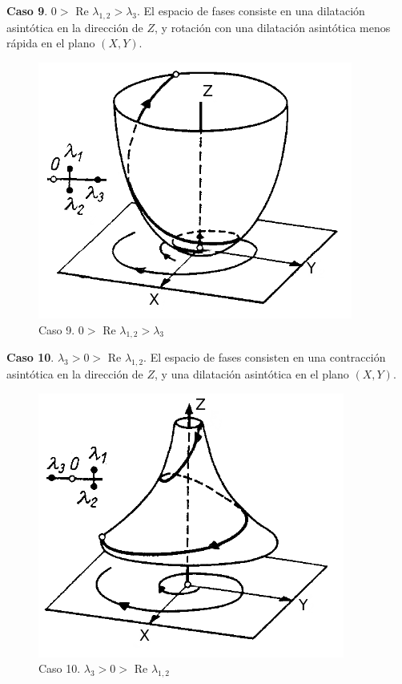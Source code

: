 \documentclass[a4paper,10pt]{article}
\begin{document}
\textbf{Caso 9}. $0 > $ Re $\lambda_{1,2} > \lambda_3$. El espacio de fases consiste en una dilatación asintótica
en la dirección de $Z$, y rotación con una dilatación asintótica menos rápida en el plano $(X,Y)$.

\begin{figure}[h!]
 \centering
\includegraphics[scale=0.35]{problema3fig10}
\caption{Caso 9. $0 > $ Re $\lambda_{1,2} > \lambda_3$}
\label{fig:problema3fig10}
\end{figure}
\vspace{.3cm}

\textbf{Caso 10}. $\lambda_3 > 0 > $ Re $\lambda_{1,2}$. El espacio de fases consisten en una contracción asintótica
en la dirección de $Z$, y una dilatación asintótica en el plano $(X,Y)$.

\begin{figure}[h!]
 \centering
\includegraphics[scale=0.35]{problema3fig11}
\caption{Caso 10. $\lambda_3 > 0 > $ Re $\lambda_{1,2}$}
\label{fig:problema3fig11}
\end{figure}
\vspace{.3cm}
\end{document}
